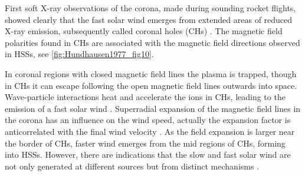 First soft X-ray observations of the corona, made during sounding rocket flights, showed clearly that the fast solar wind emerges from extended areas of reduced X-ray emission, subsequently called coronal holes (CHs) \citep{Krieger1973,Hundhausen1977}. The magnetic field polarities found in CHs are associated with the magnetic field directions observed in HSSs, see \autoref{fig:Hundhausen1977_fig10}.
\begin{figure}[htb]
\end{figure}
In coronal regions with closed magnetic field lines the plasma is trapped, though in CHs it can escape following the open magnetic field lines outwards into space. Wave-particle interactions heat and accelerate the ions in CHs, leading to the emission of a fast solar wind \citep{Hollweg2002}. Superradial expansion of the magnetic field lines in the corona has an influence on the wind speed, actually the expansion factor is anticorrelated with the final wind velocity \citep{Wang1990}. As the field expansion is larger near the border of CHs, faster wind emerges from the mid regions of CHs, forming into HSSs. However, there are indications that the slow and fast solar wind are not only generated at different sources but from distinct mechanisms \citep{McGregor2011b}.

